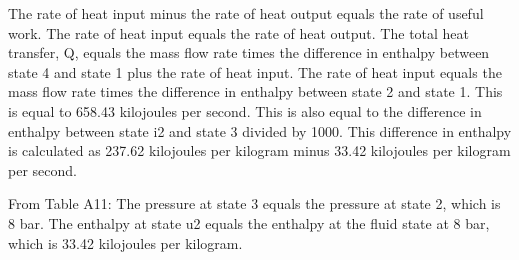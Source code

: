 The rate of heat input minus the rate of heat output equals the rate of useful work. The rate of heat input equals the rate of heat output. The total heat transfer, Q, equals the mass flow rate times the difference in enthalpy between state 4 and state 1 plus the rate of heat input. The rate of heat input equals the mass flow rate times the difference in enthalpy between state 2 and state 1. This is equal to 658.43 kilojoules per second. This is also equal to the difference in enthalpy between state i2 and state 3 divided by 1000. This difference in enthalpy is calculated as 237.62 kilojoules per kilogram minus 33.42 kilojoules per kilogram per second.

From Table A11:
The pressure at state 3 equals the pressure at state 2, which is 8 bar. The enthalpy at state u2 equals the enthalpy at the fluid state at 8 bar, which is 33.42 kilojoules per kilogram.